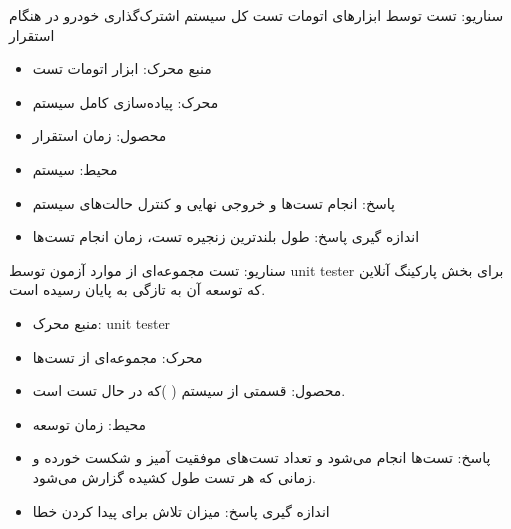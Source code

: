سناریو: تست توسط ابزارهای اتومات تست کل سیستم اشترک‌گذاری خودرو در هنگام استقرار
\begin{itemize}
\item
منبع محرک: ابزار اتومات تست
\item
محرک: پیاده‌سازی کامل سیستم 
\item
محصول: زمان استقرار 
\item
محیط: سیستم 
\item
پاسخ: انجام تست‌ها و خروجی نهایی و کنترل حالت‌های سیستم 
\item
اندازه گیری پاسخ: طول بلندترین زنجیره تست، زمان انجام تست‌ها
\end{itemize}

سناریو: تست مجموعه‌ای از موارد آزمون توسط unit tester برای بخش  پارکینگ آنلاین که توسعه آن به تازگی به پایان رسیده است.
\begin{itemize}
\item
منبع محرک: unit tester
\item
محرک: مجموعه‌ای از تست‌ها 
\item
محصول: قسمتی از سیستم (  )که در حال تست است. 
\item
محیط: زمان توسعه
\item
پاسخ: تست‌ها انجام می‌شود و تعداد تست‌های موفقیت آمیز و شکست خورده و زمانی که هر تست طول کشیده گزارش می‌شود.
\item
اندازه گیری پاسخ: میزان تلاش برای پیدا کردن خطا
\end{itemize}
